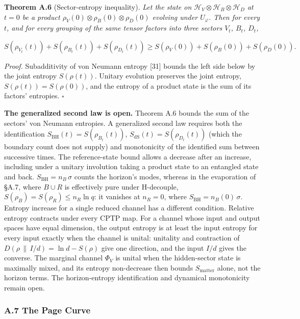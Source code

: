 \documentclass[
]{article}
\begin{document}
\textbf{Theorem A.6} (Sector-entropy inequality). \emph{Let the state on
\(\mathcal{H}_V \otimes \mathcal{H}_B \otimes \mathcal{H}_D\) at
\(t = 0\) be a product \(\rho_V(0) \otimes \rho_B(0) \otimes \rho_D(0)\)
evolving under \(U_\varphi\). Then for every \(t\), and for every
grouping of the same tensor factors into three sectors \(V_t\), \(B_t\),
\(D_t\),}

\[S(\rho_{V_t}(t)) + S(\rho_{B_t}(t)) + S(\rho_{D_t}(t)) \geq S(\rho_V(0)) + S(\rho_B(0)) + S(\rho_D(0)).\]

\emph{Proof.} Subadditivity of von Neumann entropy {[}31{]} bounds the
left side below by the joint entropy \(S(\rho(t))\). Unitary evolution
preserves the joint entropy, \(S(\rho(t)) = S(\rho(0))\), and the
entropy of a product state is the sum of its factors' entropies.
\(\square\)

\textbf{The generalized second law is open.} Theorem A.6 bounds the sum
of the sectors' von Neumann entropies. A generalized second law requires
both the identification \(S_{\text{BH}}(t)=S(\rho_{B_t}(t))\),
\(S_{\text{dS}}(t)=S(\rho_{D_t}(t))\) (which the boundary count does not
supply) and monotonicity of the identified sum between successive times.
The reference-state bound allows a decrease after an increase, including
under a unitary involution taking a product state to an entangled state
and back. \(S_{\text{BH}} = n_B\,\sigma\) counts the horizon's modes,
whereas in the evaporation of §A.7, where \(B \cup R\) is effectively
pure under H-decouple, \(S(\rho_B) = S(\rho_R) \leq n_R \ln q\): it
vanishes at \(n_R = 0\), where \(S_{\text{BH}} = n_B(0)\,\sigma\).
Entropy increase for a single reduced channel has a different condition.
Relative entropy contracts under every CPTP map. For a channel whose
input and output spaces have equal dimension, the output entropy is at
least the input entropy for every input exactly when the channel is
unital: unitality and contraction of
\(D(\rho\,\|\,I/d) = \ln d - S(\rho)\) give one direction, and the input
\(I/d\) gives the converse. The marginal channel \(\Phi_V\) is unital
when the hidden-sector state is maximally mixed, and its entropy
non-decrease then bounds \(S_{\text{matter}}\) alone, not the horizon
terms. The horizon-entropy identification and dynamical monotonicity
remain open.

\hypertarget{a.7-the-page-curve}{%
\subsubsection{A.7 The Page Curve}\label{a.7-the-page-curve}}
\end{document}

